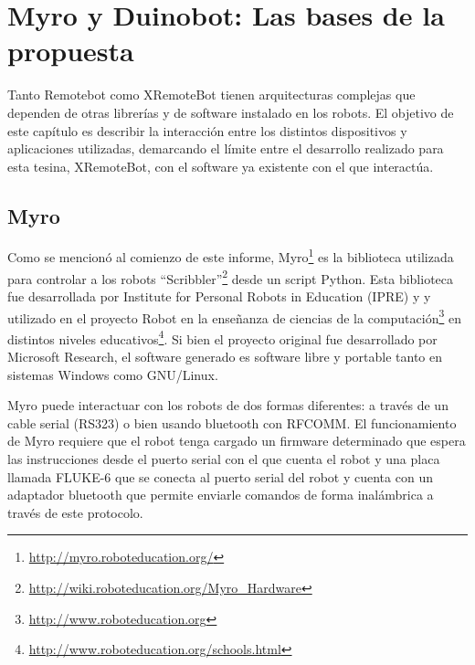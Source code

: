 \chapter{Myro y Duinobot: Las bases de la propuesta}\label{cha:arquitectura}




Tanto Remotebot como XRemoteBot tienen arquitecturas complejas que
dependen de otras librerías y de software instalado en los robots.
El objetivo de este capítulo es describir la interacción entre los
distintos dispositivos y aplicaciones utilizadas, demarcando el límite
entre el desarrollo realizado para esta tesina, XRemoteBot, con el software ya
existente con el que interactúa.

\section{Myro}\label{sec:myro}

Como se mencionó al comienzo de este informe,
Myro\footnote{\url{http://myro.roboteducation.org/}}
es la biblioteca utilizada para controlar a los robots
``Scribbler''\footnote{\url{http://wiki.roboteducation.org/Myro_Hardware}}
desde un script Python. Esta biblioteca fue desarrollada por
Institute for Personal Robots in Education (IPRE) y
y utilizado en el proyecto Robot en la enseñanza de ciencias
de la computación\footnote{\url{http://www.roboteducation.org}}
en distintos niveles
educativos\footnote{\url{http://www.roboteducation.org/schools.html}}.
Si bien el proyecto original fue desarrollado por Microsoft Research,
el software generado es software libre y portable tanto en sistemas Windows
como GNU/Linux.


Myro puede interactuar con los robots de dos
formas diferentes: a través de un cable serial (RS323) o bien usando bluetooth
con RFCOMM. El funcionamiento de Myro requiere que el robot tenga
cargado un firmware determinado que espera las instrucciones desde el puerto
serial con el que cuenta el robot y una placa llamada FLUKE-6 que se conecta
al puerto serial del robot y cuenta con un adaptador bluetooth que permite
enviarle comandos de forma inalámbrica a través de este protocolo.

